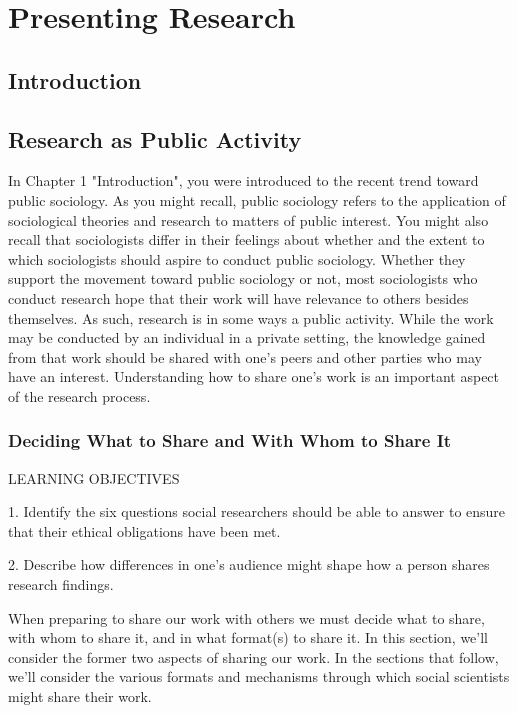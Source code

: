 \chapter{Presenting Research}

\section{Introduction}

\section{Research as Public Activity}

In Chapter 1 "Introduction", you were introduced to the recent trend toward public sociology. As you might recall, public sociology refers to the application of sociological theories and research to matters of public interest. You might also recall that sociologists differ in their feelings about whether and the extent to which sociologists should aspire to conduct public sociology. Whether they support the movement toward public sociology or not, most sociologists who conduct research hope that their work will have relevance to others besides themselves. As such, research is in some ways a public activity. While the work may be conducted by an individual in a private setting, the knowledge gained from that work should be shared with one’s peers and other parties who may have an interest. Understanding how to share one’s work is an important aspect of the research process.

\subsection{Deciding What to Share and With Whom to Share It}

LEARNING OBJECTIVES

1. Identify the six questions social researchers should be able to answer to ensure that their ethical obligations have been met.

2. Describe how differences in one’s audience might shape how a person shares research findings.

When preparing to share our work with others we must decide what to share, with whom to share it, and in what format(s) to share it. In this section, we’ll consider the former two aspects of sharing our work. In the sections that follow, we’ll consider the various formats and mechanisms through which social scientists might share their work.


